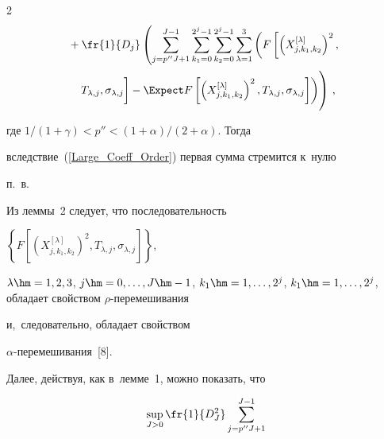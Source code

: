 \begin{multicols}{2}
\begin{multline*}
{}+\fr{1}{D_j}\left( \sum\limits_{j = p''J+1}^{J-1}\sum\limits_{k_1 = 0}^{2^j - 1}


\sum\limits_{k_2 = 0}^{2^j - 1}\sum\limits_{\lambda = 1}^{3}


\left(F\left[\left(X_{j,k_1,k_2}^{[\lambda]}\right)^2,\right.\right.\right.\\[1pt]


\left.\left.\left.T_{\lambda,j},\sigma_{\lambda,j}


\vphantom{\left(X_{j,k_1,k_2}^{[\lambda]}\right)^2}


\right] -


 \Expect


F\left[\left(X_{j,k_1,k_2}^{[\lambda]}\right)^2,T_{\lambda,j},\sigma_{\lambda,j}


\right]\right)\!


\vphantom{\sum\limits_{j = 0}^{p''J}\sum\limits_{k_1 = 0}^{2^j - 1}}


\right)\,,


\end{multline*}


где ${1}/(1+\gamma) < p'' <(1+\alpha)/(2+\alpha)$. Тогда


вследствие~(\ref{Large_Coeff_Order}) первая сумма стремится к~нулю


п.~в.





Из леммы~2 следует, что последовательность


$\left\{F\left[\left(X_{j,k_1,k_2}^{[\lambda]}\right)^2,T_{\lambda,j},\sigma_{\lambda,j}\right]\right\}$,


$\lambda\hm=1,2,3$, $j \hm= 0,\dots, J \hm- 1$, $k_1 \hm= 1,\dots, 2^j$, $k_1 \hm=


1,\dots, 2^j$, обладает свойством $\rho$-пе\-ре\-ме\-ши\-ва\-ния


и,~следовательно, обладает свойством


$\alpha$-пе\-ре\-ме\-ши\-ва\-ния~[8].





Далее, действуя, как в~лемме~1, можно показать, что





\noindent


\begin{multline*}


\sup\limits_{J > 0} \fr{1}{D^2_J}


\sum\limits_{j = p''J + 1}^{J - 1}



\end{multline*}
\end{multicols}
